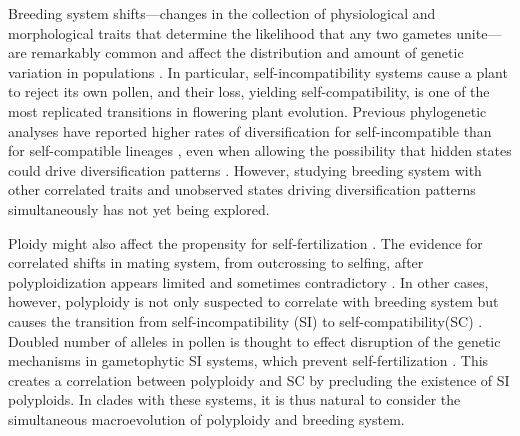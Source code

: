 Breeding system shifts---changes in the collection of physiological and morphological traits that determine the likelihood that any two gametes unite---are remarkably common and affect the distribution and amount of genetic variation in populations \citep{stebbins1974, barrett2013}.
In particular, self-incompatibility systems cause a plant to reject its own pollen, and their loss, yielding self-compatibility, is one of the most replicated transitions in flowering plant evolution. %
Previous phylogenetic analyses have reported higher rates of diversification for self-incompatible than for self-compatible lineages \citep{goldberg_2010, devos2014}, even when allowing the possibility that hidden states could drive diversification patterns \citep{freyman_2018}.
However, studying breeding system with other correlated traits and unobserved states driving diversification patterns simultaneously has not yet being explored. %

Ploidy might also affect the propensity for self-fertilization \citep{stebbins1950}. 
The evidence for correlated shifts in mating system, from outcrossing to selfing, after polyploidization appears limited and sometimes contradictory \citep{barringer2007, barrett2008, husband2008}.
In other cases, however, polyploidy is not only suspected to correlate with breeding system but causes the transition from self-incompatibility (SI) to self-compatibility(SC) \citep{stout1942, lewis1947}.
Doubled number of alleles in pollen is thought to effect disruption of the genetic mechanisms in gametophytic SI systems, which prevent self-fertilization \citep{entani1999, tsukamoto2005, kubo2010}. 
This creates a correlation between polyploidy and SC by precluding the existence of SI polyploids.
In clades with these systems, it is thus natural to consider the simultaneous macroevolution of polyploidy and breeding system.

